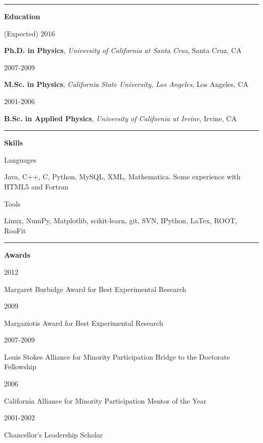 \documentclass[10pt]{article}
\newcommand{\resumesection}[1] {
    \noindent
    \textcolor{indigodye}{\rule{.15\textwidth}{.1in} \hspace{0.01 \textwidth} \textbf{\Large{#1}}} \newline
}
\newcommand{\educationentry}[4] { 
    \noindent
    \begin{minipage}[t]{0.15\textwidth} \begin{flushright} #1 \end{flushright} \end{minipage} \hspace{0.01\textwidth}
    \begin{minipage}[t]{0.84\textwidth} 
        \textbf{#2}, \emph{#3}, #4
    \end{minipage}
}
\newcommand{\skillsentry}[2] { 
    \noindent
    \begin{minipage}[t]{0.15\textwidth} \begin{flushright} #1 \end{flushright} \end{minipage} \hspace{0.01\textwidth}
    \begin{minipage}[t]{0.84\textwidth} #2 \end{minipage}
}
\newcommand{\awardentry}[2] { 
    \noindent
    \begin{minipage}[t]{0.15\textwidth} \begin{flushright} #1 \end{flushright} \end{minipage} \hspace{0.01\textwidth}
    \begin{minipage}[t]{0.84\textwidth} #2 \end{minipage}
}
\begin{document}
    \resumesection{Education}
        \educationentry{(Expected) 2016}
                       {Ph.D. in Physics}
                       {University of California at Santa Cruz}
                       {Santa Cruz, CA}
        \educationentry{2007-2009}
                       {M.Sc. in Physics}
                       {California State University, Los Angeles}
                       {Los Angeles, CA}
        \educationentry{2001-2006}
                       {B.Sc. in Applied Physics}
                       {University of California at Irvine}
                       {Irvine, CA}

    \resumesection{Skills}
    \skillsentry{Languages}{Java, C++, C, Python, MySQL, XML, Mathematica. Some experience with HTML5 and Fortran}
        \skillsentry{Tools}{Linux, NumPy, Matplotlib, scikit-learn, git, SVN, IPython, LaTex, ROOT, RooFit}

    \resumesection{Awards}
        \awardentry{2012}{Margaret Burbidge Award for Best Experimental Research}
        \awardentry{2009}{Margaziotis Award for Best Experimental Research}
        \awardentry{2007-2009}{Louis Stokes Alliance for Minority Participation Bridge to the Doctorate 
                               Fellowship}
        \awardentry{2006}{California Alliance for Minority Participation Mentor of the Year}
        \awardentry{2001-2002}{Chancellor's Leadership Scholar}
\end{document}
